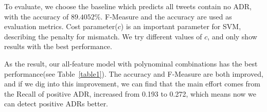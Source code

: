 \documentclass[11pt]{article}
\begin{document}
To evaluate, we choose the baseline which predicts all tweets contain no ADR,
with the accuracy of $89.4052\%$.
F-Measure and the accuracy are used as evaluation metrics.
Cost parameter($c$) is an important parameter for SVM,
describing the penalty for mismatch.
We try different values of $c$,
and only show results with the best performance.

As the result,
our all-feature model with polynominal combinations
has the best performance(see Table~\ref{table1}).
The accuracy and F-Measure are both improved,
and if we dig into this improvement, we can find that
the main effort comes from the Recall of positive ADR,
increased from 0.193 to 0.272,
which means now we can detect positive ADRs better.




%
%
%
%
%
\end{document}
